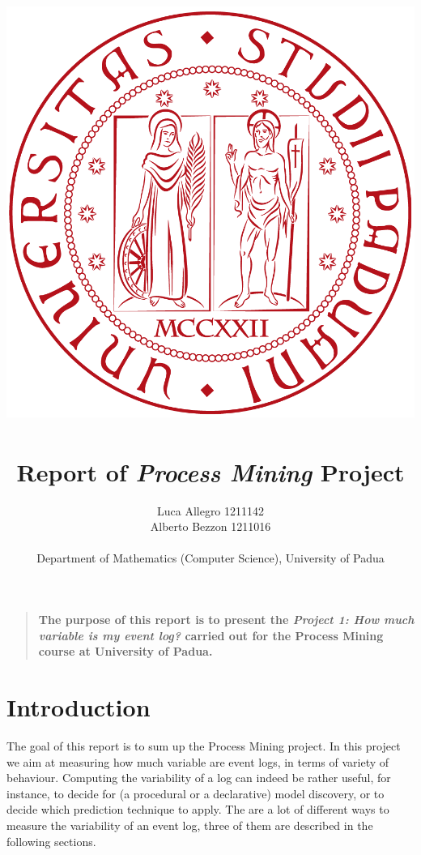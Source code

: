 \documentclass[12pt]{article}
\title{
		\includegraphics[scale=0.20]{logo-unipd}~ 
		\\[2cm]
		Report of {\it Process Mining\/} Project
	}
\author
{Luca Allegro 1211142 \\ Alberto Bezzon 1211016\\
\\
Department of Mathematics (Computer Science), University of Padua
}
\date{}
\newenvironment{sciabstract}{%
\begin{quote} \bf}
{\end{quote}}
\begin{document}
 


\baselineskip18pt


\maketitle 




\begin{sciabstract}
	The purpose of this report is to present the \textit{Project 1: How much variable is my event log?} carried out for the Process Mining course at University of Padua.
\end{sciabstract}




\newpage
\section*{Introduction}

The goal of this report is to sum up the Process Mining project. In this project we aim at measuring how much variable are event logs, in terms of variety of behaviour. Computing the variability of a log can indeed be rather useful, for instance, to decide for (a procedural or a declarative) model discovery, or to decide which prediction technique to apply. The are a lot of different ways to measure the variability of an event log, three of them are described in the following sections.
\end{document}
